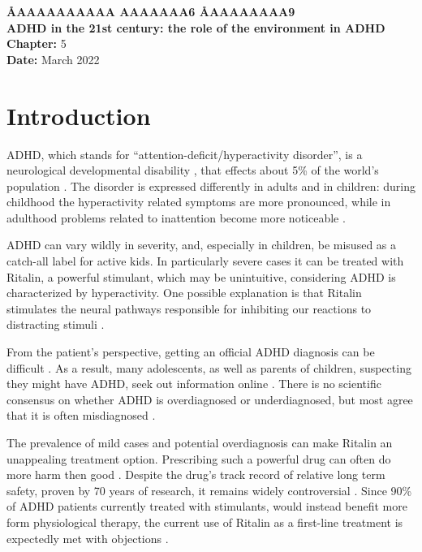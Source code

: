 \documentclass[a4paper,11pt]{article}
\begin{document}
  \begin{singlespace}
    \large
    {\bf \AA{AAAAAAAAAA AAAAAAA}{6} \AA{AAAAAAAA}{9}} \\[12pt]
    {\huge\bf ADHD in the 21st century: the role of the environment in ADHD} \\[6pt]
    \textbf{Chapter:} 5 \\
    \textbf{Date:} March 2022
  \end{singlespace}
  \vspace{-\parskip}

  \section{Introduction}
  ADHD, which stands for ``attention-deficit/hyperactivity disorder'',
  is a neurological developmental disability \cite{adolescents},
  that effects about 5\% of the world's population \cite{underdiagnosis}.
  The disorder is expressed differently in adults and in children:
  during childhood the hyperactivity related symptoms are more pronounced,
  while in adulthood problems related to inattention become more noticeable \cite{underdiagnosis}.

  ADHD can vary wildly in severity, and, especially in children, be misused as a catch-all label for active kids.
  In particularly severe cases it can be treated with Ritalin, a powerful stimulant,
  which may be unintuitive, considering ADHD is characterized by hyperactivity.
  One possible explanation is that Ritalin stimulates the neural pathways responsible for
  inhibiting our reactions to distracting stimuli \cite{thebook}.

  From the patient's perspective, getting an official ADHD diagnosis can be difficult \cite{diagnosisdifficulty}.
  As a result, many adolescents, as well as parents of children, suspecting they might have ADHD,
  seek out information online \cite{informationseeking}.
  There is no scientific consensus on whether ADHD is overdiagnosed or underdiagnosed,
  but most agree that it is often misdiagnosed \cite{overorunderdiagnosed}.

  The prevalence of mild cases and potential overdiagnosis can make Ritalin an unappealing treatment option.
  Prescribing such a powerful drug can often do more harm then good \cite{thebook}.
  Despite the drug's track record of relative long term safety, proven by 70 years of research,
  it remains widely controversial \cite{controversy}.
  Since 90\% of ADHD patients currently treated with stimulants,
  would instead benefit more form physiological therapy,
  the current use of Ritalin as a first-line treatment is expectedly met with objections \cite{controversy}.
\end{document}
